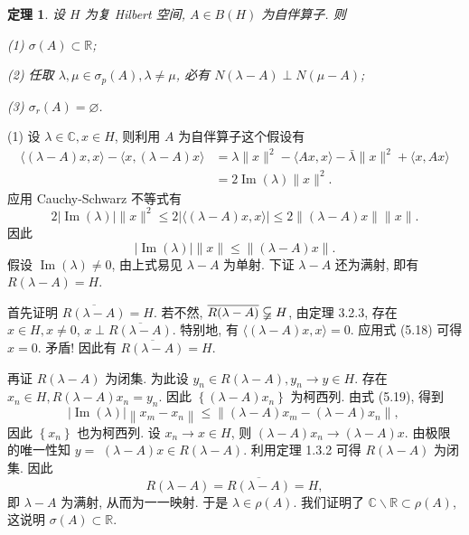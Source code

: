 \documentclass[openany]{ctexbook}
\makeatletter
\theoremstyle{kaiti}
\newtheorem{theorem}{定理}[section]
\theoremstyle{normal}
\renewenvironment{proof}[1][\proofname]{\par
    \pushQED{\qed}%
    \normalfont \topsep6\p@\@plus6\p@\relax
    \trivlist
    \item\relax
    {\heiti #1}\hspace{2\labelsep}\ignorespaces
  }{%
    \popQED\endtrivlist\@endpefalse
  }
\makeatother
\begin{document}
\begin{theorem}
设 $H$ 为复 Hilbert 空间, $A \in B(H)$ 为自伴算子. 则

(1) $\sigma(A) \subset \mathbb{R}$;

(2) 任取 $\lambda, \mu \in \sigma_{p}(A), \lambda \neq \mu$, 必有 $N(\lambda-A) \perp N(\mu-A)$;

(3) $\sigma_{r}(A)=\varnothing$.
\end{theorem}

\begin{proof}
(1) 设 $\lambda \in \mathbb{C}, x \in H$, 则利用 $A$ 为自伴算子这个假设有
\begin{equation}
  \begin{aligned}
    \langle(\lambda-A) x, x\rangle-\langle x,(\lambda-A) x\rangle&=\lambda\|x\|^2-\langle A x, x\rangle-\bar{\lambda}\|x\|^2+\langle x, A x\rangle\\
    &=2 \operatorname{Im}(\lambda)\|x\|^2.
  \end{aligned}
\end{equation}
应用 Cauchy-Schwarz 不等式有
\begin{equation}
  2|\operatorname{Im}(\lambda)|\|x\|^2 \leqslant 2|\langle(\lambda-A) x, x\rangle| \leqslant 2\|(\lambda-A) x\|\|x\|.
\end{equation}
因此
\begin{equation}
  |\operatorname{Im}(\lambda)|\|x\| \leqslant\|(\lambda-A) x\|.
\end{equation}
假设 $\operatorname{Im}(\lambda) \neq 0$, 由上式易见 $\lambda-A$ 为单射. 下证 $\lambda-A$ 还为满射, 即有 $R(\lambda-A)=H$.

首先证明 $\overline{R(\lambda-A)}=H$. 若不然, $\overline{R(\lambda-A)} \varsubsetneqq H$, 由定理 3.2.3, 存在 $x \in H, x \neq 0$, $x \perp \overline{R(\lambda-A)}$. 特别地, 有 $\langle(\lambda-A) x, x\rangle=0$. 应用式 (5.18) 可得 $x=0$. 矛盾! 因此有 $\overline{R(\lambda-A)}=H$.

再证 $R(\lambda-A)$ 为闭集. 为此设 $y_n \in R(\lambda-A), y_n \rightarrow y \in H$. 存在 $x_n \in H, R(\lambda-A) x_n=y_n$. 因此 $\left\{(\lambda-A) x_n\right\}$ 为柯西列. 由式 (5.19), 得到
$$
|\operatorname{Im}(\lambda)|\left\|x_m-x_n\right\| \leqslant\left\|(\lambda-A) x_m-(\lambda-A) x_n\right\| \text {, }
$$
因此 $\left\{x_n\right\}$ 也为柯西列. 设 $x_n \rightarrow x \in H$, 则 $(\lambda-A) x_n \rightarrow(\lambda-A) x$. 由极限的唯一性知 $y=$ $(\lambda-A) x \in R(\lambda-A)$. 利用定理 1.3.2 可得 $R(\lambda-A)$ 为闭集. 因此
$$
R(\lambda-A)=\overline{R(\lambda-A)}=H,
$$
即 $\lambda-A$ 为满射, 从而为一一映射. 于是 $\lambda \in \rho(A)$. 我们证明了 $\mathbb{C} \backslash \mathbb{R} \subset \rho(A)$, 这说明 $\sigma(A) \subset \mathbb{R}$.


\end{proof}
\end{document}

